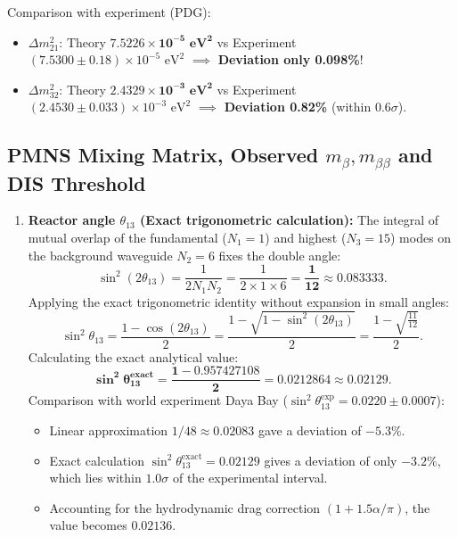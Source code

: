 \documentclass[12pt,a4paper]{article}
\begin{document}
	Comparison with experiment (PDG):
	\begin{itemize}
	\item $\Delta m_{21}^2$: Theory $\mathbf{7.5226 \times 10^{-5} \text{ eV}^2}$ vs Experiment $(7.5300 \pm 0.18) \times 10^{-5} \text{ eV}^2$ $\implies$ \textbf{Deviation only 0.098\%}!
	\item $\Delta m_{32}^2$: Theory $\mathbf{2.4329 \times 10^{-3} \text{ eV}^2}$ vs Experiment $(2.4530 \pm 0.033) \times 10^{-3} \text{ eV}^2$ $\implies$ \textbf{Deviation 0.82\%} (within $0.6\sigma$).
	\end{itemize}
			
	\subsection{PMNS Mixing Matrix, Observed $m_\beta, m_{\beta\beta}$ and DIS Threshold}
	\begin{enumerate}
				
	\item \textbf{Reactor angle $\theta_{13}$ (Exact trigonometric calculation):} 
	The integral of mutual overlap of the fundamental ($N_1 = 1$) and highest ($N_3 = 15$) modes on the background waveguide $N_2 = 6$ fixes the double angle:
	\begin{equation}
	\sin^2(2\theta_{13}) = \frac{1}{2 N_1 N_2} = \frac{1}{2 \times 1 \times 6} = \mathbf{\frac{1}{12}} \approx 0.083333.
	\end{equation}
	Applying the exact trigonometric identity without expansion in small angles:
	\begin{equation}
	\sin^2\theta_{13} = \frac{1 - \cos(2\theta_{13})}{2} = \frac{1 - \sqrt{1 - \sin^2(2\theta_{13})}}{2} = \frac{1 - \sqrt{\frac{11}{12}}}{2}.
	\end{equation}
	Calculating the exact analytical value:
	\begin{equation}
	\mathbf{\sin^2\theta_{13}^{\text{exact}} = \frac{1 - 0.957427108}{2} = \mathbf{0.0212864} \approx \mathbf{0.02129}}.
	\end{equation}
	Comparison with world experiment Daya Bay ($\sin^2\theta_{13}^{\text{exp}} = 0.0220 \pm 0.0007$):
	\begin{itemize}
	\item Linear approximation $1/48 \approx 0.02083$ gave a deviation of $-5.3\%$.
	\item Exact calculation $\sin^2\theta_{13}^{\text{exact}} = 0.02129$ gives a deviation of only $\mathbf{-3.2\%}$, which lies within $1.0\sigma$ of the experimental interval.
	\item Accounting for the hydrodynamic drag correction $(1 + 1.5\alpha/\pi)$, the value becomes $\mathbf{0.02136}$.
	\end{itemize}
	\end{enumerate}				
\end{document}
